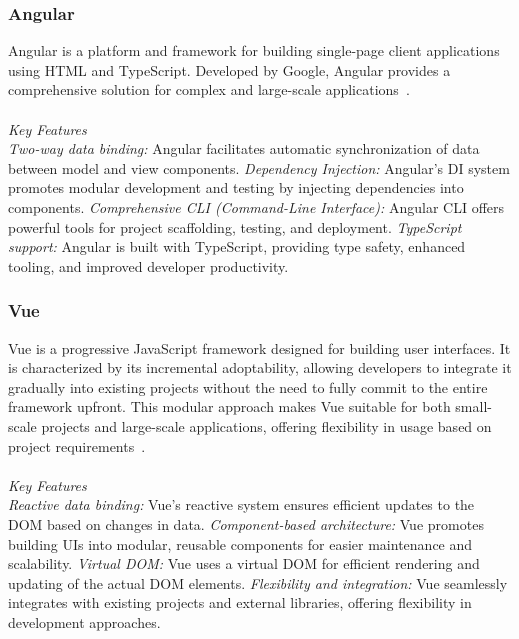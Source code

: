 \documentclass[conference]{IEEEtran}
\begin{document}
\subsubsection{Angular}

Angular is a platform and framework for building single-page client applications using HTML and TypeScript. Developed by Google, Angular provides a comprehensive solution for complex and large-scale applications~\cite{angular-io}.
\\\\
\textit{Key Features}\\
\textit{Two-way data binding:} Angular facilitates automatic synchronization of data between model and view components.
\newline\textit{Dependency Injection:} Angular's DI system promotes modular development and testing by injecting dependencies into components.
\newline\textit{Comprehensive CLI (Command-Line Interface):} Angular CLI offers powerful tools for project scaffolding, testing, and deployment.
\newline\textit{TypeScript support:} Angular is built with TypeScript, providing type safety, enhanced tooling, and improved developer productivity.
\newline
\subsubsection{Vue}

Vue is a progressive JavaScript framework designed for building user interfaces. It is characterized by its incremental adoptability, allowing developers to integrate it gradually into existing projects without the need to fully commit to the entire framework upfront. This modular approach makes Vue suitable for both small-scale projects and large-scale applications, offering flexibility in usage based on project requirements~\cite{vuejs2024}.
\\\\
\textit{Key Features}\\
\textit{Reactive data binding:} Vue's reactive system ensures efficient updates to the DOM based on changes in data.
\newline\textit{Component-based architecture:} Vue promotes building UIs into modular, reusable components for easier maintenance and scalability.
\newline\textit{Virtual DOM:} Vue uses a virtual DOM for efficient rendering and updating of the actual DOM elements.
\newline\textit{Flexibility and integration:} Vue seamlessly integrates with existing projects and external libraries, offering flexibility in development approaches.
\newline
\end{document}
